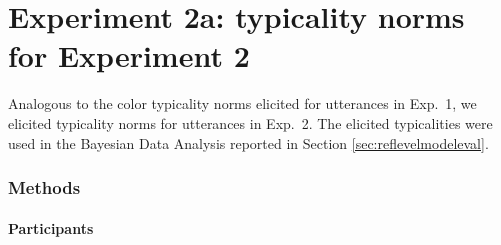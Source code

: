 \documentclass[11pt]{article}
\newcommand{\figref}[1]{Figure \ref{#1}}
\newcommand{\sectionref}[1]{Section \ref{#1}}
\begin{document}
%
%

\section{Experiment 2a: typicality norms for Experiment 2}
\label{app:typicalitynorms2}

Analogous to the color typicality norms elicited for utterances in Exp.~1, we elicited typicality norms for utterances in Exp.~2. The elicited typicalities were used in the Bayesian Data Analysis reported in \sectionref{sec:reflevelmodeleval}.

\subsubsection{Methods}

\paragraph{Participants}
\end{document}
